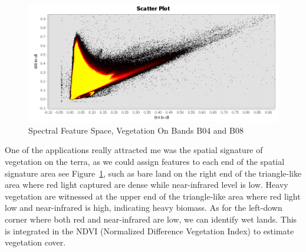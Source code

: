 \documentclass[
  letterpaper,
  DIV=11,
  numbers=noendperiod]{scrreprt}
\begin{document}
\begin{figure}

{\centering \includegraphics{./images/spectral_feature_space_vege_B04_B08.png}

}

\caption{\label{fig-vege}Spectral Feature Space, Vegetation On Bands B04
and B08}

\end{figure}

One of the applications really attracted me was the spatial signature of
vegetation on the terra, as we could assign features to each end of the
spatial signature area see Figure~\ref{fig-vege}, such as bare land on
the right end of the triangle-like area where red light captured are
dense while near-infrared level is low. Heavy vegetation are witnessed
at the upper end of the triangle-like area where red light low and
near-infrared is high, indicating heavy biomass. As for the left-down
corner where both red and near-infrared are low, we can identify wet
lands. This is integrated in the NDVI (Normalized Difference Vegetation
Index) to estimate vegetation cover.
\end{document}
